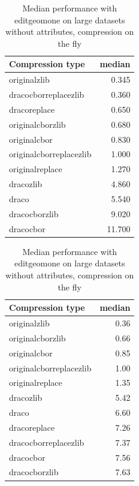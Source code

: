   \begin{table}[!h]
    \begin{minipage}{.5\linewidth}
      \caption{
Median performance with editgeomone on large datasets, compression on the fly}
\centering

\begin{tabular}{|l|r|}
\hline
Compression type & median\\
\hline
originalzlib & 0.345\\
\hline
dracocborreplacezlib & 0.360\\
\hline
dracoreplace & 0.650\\
\hline
originalcborzlib & 0.680\\
\hline
originalcbor & 0.830\\
\hline
originalcborreplacezlib & 1.000\\
\hline
originalreplace & 1.270\\
\hline
dracozlib & 4.860\\
\hline
draco & 5.540\\
\hline
dracocborzlib & 9.020\\
\hline
dracocbor & 11.700\\
\hline
\end{tabular}
\end{minipage}%
    \begin{minipage}{.5\linewidth}
      \centering
        \caption{
Median performance with editgeomone on large datasets without attributes, compression on the fly}

\begin{tabular}{|l|r|}
\hline
Compression type & median\\
\hline
originalzlib & 0.36\\
\hline
originalcborzlib & 0.66\\
\hline
originalcbor & 0.85\\
\hline
originalcborreplacezlib & 1.00\\
\hline
originalreplace & 1.35\\
\hline
dracozlib & 5.42\\
\hline
draco & 6.60\\
\hline
dracoreplace & 7.26\\
\hline
dracocborreplacezlib & 7.37\\
\hline
dracocbor & 7.56\\
\hline
dracocborzlib & 7.63\\
\hline
\end{tabular}
\end{minipage} 
\end{table}
